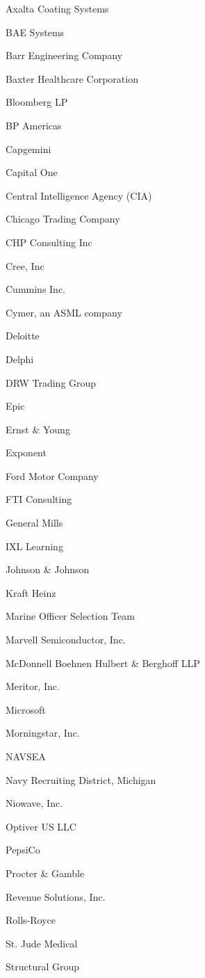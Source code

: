 \documentclass[twoside]{article}
\begin{document}
\begin{center}
\begin{multicols}{5}
\begin{FlushLeft}
\begin{compactitem}
\item Axalta Coating Systems
\item BAE Systems
\item Barr Engineering Company
\item Baxter Healthcare Corporation
\item Bloomberg LP
\item BP Americas
\item Capgemini
\item Capital One
\item Central Intelligence Agency (CIA)
\item Chicago Trading Company
\item CHP Consulting Inc
\item Cree, Inc
\item Cummins Inc.
\item Cymer, an ASML company
\item Deloitte
\item Delphi
\item DRW Trading Group
\item Epic
\item Ernst \& Young
\item Exponent
\item Ford Motor Company
\item FTI Consulting
\item General Mills
\item IXL Learning
\item Johnson \& Johnson
\item Kraft Heinz
\item Marine Officer Selection Team
\item Marvell Semiconductor, Inc.
\item McDonnell Boehnen Hulbert \& Berghoff LLP
\item Meritor, Inc.
\item Microsoft
\item Morningstar, Inc.
\item NAVSEA
\item Navy Recruiting District, Michigan
\item Niowave, Inc.
\item Optiver US LLC
\item PepsiCo
\item Procter \& Gamble
\item Revenue Solutions, Inc.
\item Rolls-Royce
\item St. Jude Medical
\item Structural Group

\end{compactitem}
\end{FlushLeft}
\end{multicols}
\end{center}
\end{document}
